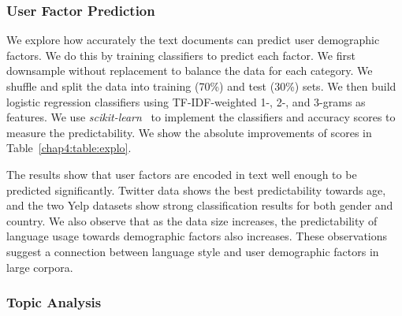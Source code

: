 \subsubsection{User Factor Prediction}

We explore how accurately the text documents can predict user demographic factors. 
We do this by training classifiers to predict each factor.
We first downsample without replacement to balance the data for each category. We shuffle and split the data into training (70\%) and test (30\%) sets. 
We then build logistic regression classifiers using TF-IDF-weighted 1-, 2-, and 3-grams as features. 
We use \textit{scikit-learn}~\cite{pedregosa2011scikit} to implement the classifiers and accuracy scores to measure the predictability.
We show the absolute improvements of scores in Table~\ref{chap4:table:explo}. 

The results show that user factors are encoded in text
well enough to be predicted significantly.
Twitter data shows the best predictability towards age, and the two Yelp datasets show strong classification results for both gender and country. We also observe that as the data size increases, the predictability of language usage towards demographic factors also increases. These observations suggest a connection between language style and user demographic factors in large corpora.


\subsubsection{Topic Analysis}

